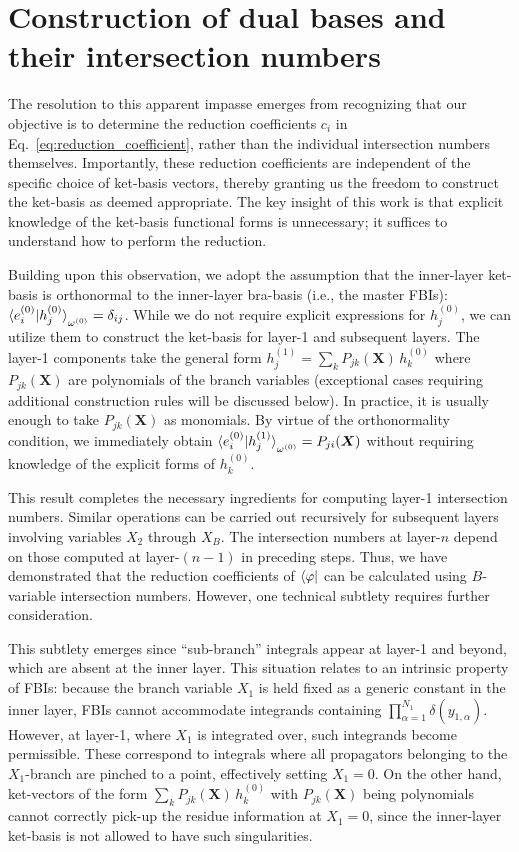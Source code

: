 \documentclass[reprint,superscriptaddress]{revtex4-2}
\newcommand{\w}{\omega}
\begin{document}
\section{Construction of dual bases and their intersection numbers}\label{sec:dual}

The resolution to this apparent impasse emerges from recognizing that our objective is to determine the reduction coefficients $c_i$ in Eq.~\eqref{eq:reduction_coefficient}, rather than the individual intersection numbers themselves. Importantly, these reduction coefficients are independent of the specific choice of ket-basis vectors, thereby granting us the freedom to construct the ket-basis as deemed appropriate. The key insight of this work is that explicit knowledge of the ket-basis functional forms is unnecessary; it suffices to understand how to perform the reduction.

Building upon this observation, we adopt the assumption that the inner-layer ket-basis is orthonormal to the inner-layer bra-basis (i.e., the master FBIs): $\braket{e_i^{(0)} | h_j^{(0)}}_{\w^{(0)}} = \delta_{ij}$. While we do not require explicit expressions for $h_j^{(0)}$, we can utilize them to construct the ket-basis for layer-1 and subsequent layers. The layer-1 components take the general form $h_j^{(1)} = \sum_k P_{jk}(\bm{X}) \, h_k^{(0)}$ where $P_{jk}(\bm{X})$ are polynomials of the branch variables (exceptional cases requiring additional construction rules will be discussed below). In practice, it is usually enough to take $P_{jk}(\bm{X})$ as monomials. By virtue of the orthonormality condition, we immediately obtain $\braket{e_i^{(0)} | h_j^{(1)}}_{\w^{(0)}} = P_{ji}(\bm{X})$ without requiring knowledge of the explicit forms of $h_k^{(0)}$.

This result completes the necessary ingredients for computing layer-1 intersection numbers. Similar operations can be carried out recursively for subsequent layers involving variables $X_2$ through $X_B$. The intersection numbers at layer-$n$ depend on those computed at layer-$(n-1)$ in preceding steps. Thus, we have demonstrated that the reduction coefficients of $\bra{\varphi}$ can be calculated using $B$-variable intersection numbers. However, one technical subtlety requires further consideration.

This subtlety emerges since ``sub-branch'' integrals appear at layer-1 and beyond, which are absent at the inner layer. This situation relates to an intrinsic property of FBIs: because the branch variable $X_1$ is held fixed as a generic constant in the inner layer, FBIs cannot accommodate integrands containing $\prod_{\alpha=1}^{N_1} \delta(y_{1,\alpha})$. However, at layer-1, where $X_1$ is integrated over, such integrands become permissible. These correspond to integrals where all propagators belonging to the $X_1$-branch are pinched to a point, effectively setting $X_1 = 0$. On the other hand, ket-vectors of the form $\sum_k P_{jk}(\bm{X}) \, h_k^{(0)}$ with $P_{jk}(\bm{X})$ being polynomials cannot correctly pick-up the residue information at $X_1 = 0$, since the inner-layer ket-basis is not allowed to have such singularities.
\end{document}

